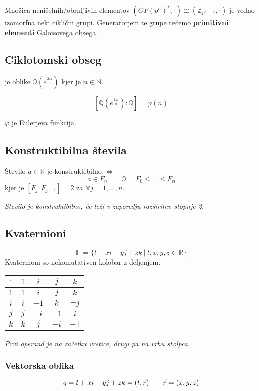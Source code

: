 Množica neničelnih/obrnljivih elementov $(GF(p^n)^*, \cdot) \cong (\mathbb{Z}_{p^n-1}, \cdot)$ je vedno izomorfna neki ciklični grupi.
Generatorjem te grupe rečemo \textbf{primitivni elementi} Galoisovega obsega.

\subsection*{Ciklotomski obseg}
je oblike $\mathbb{Q}(e^{\frac{2 \pi i}{n}})$ kjer je $n \in \mathbb{N}$.

\[ [\mathbb{Q}(e^{\frac{2 \pi i}{n}}) : \mathbb{Q}] = \varphi(n) \]

$\varphi$ je Eulerjeva funkcija.

\subsection*{Konstruktibilna števila}
Število $a \in \mathbb{R}$ je konstruktibilno $\iff$
\[a \in F_n \qquad \mathbb{Q} = F_0 \leq \dots \leq F_n\]
kjer je $[F_j : F_{j-1}] = 2$ za $\forall j = 1, \dots, n$.

\emph{Število je konstruktibilno, če leži v zaporedju razširitev stopnje 2.}

\subsection*{Kvaternioni}
\[ \mathbb{H} = \{t+xi+yj+zk\ |\ t,x,y,z \in \mathbb{R}\}\]
Kvaternioni so nekomutativen kolobar z deljenjem.
\begin{center}
	\renewcommand{\arraystretch}{1.5}
	\begin{tabular}{c | c c c c}
		$\cdot$ & $1$ & $i $ & $j $ & $k $ \\ \hline
		$1$ & $1$ & $i $ & $j $ & $k $ \\
		$i$ & $i$ & $-1$ & $k $ & $-j$ \\
		$j$ & $j$ & $-k$ & $-1$ & $i $ \\
		$k$ & $k$ & $j $ & $-i$ & $-1$ \\
	\end{tabular}
\end{center}
\emph{Prvi operand je na začetku vrstice, drugi pa na vrhu stolpca.}

\subsubsection*{Vektorska oblika}
\[ q = t+xi+yj+zk = (t, \accentset{\rightharpoonup}{r}) \qquad \accentset{\rightharpoonup}{r} = (x,y,z)\]

